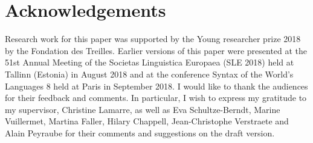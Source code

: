 \documentclass[output=paper,colorlinks,citecolor=brown, language=chinese]{langscibook}
\begin{document}
\section*{Acknowledgements}
Research work for this paper was supported by the Young researcher prize 2018 by the Fondation des Treilles. Earlier versions of this paper were presented at the 51st Annual Meeting of the Societas Linguistica Europaea (SLE 2018) held at Tallinn (Estonia) in August 2018 and at the conference Syntax of the World's Languages 8 held at Paris in September 2018. I would like to thank the audiences for their feedback and comments. In particular, I wish to express my gratitude to my supervisor, Christine Lamarre, as well as Eva Schultze-Berndt, Marine Vuillermet, Martina Faller, Hilary Chappell, Jean-Christophe Verstraete and Alain Peyraube for their comments and suggestions on the draft version.

\printbibliography[heading=subbibliography,notkeyword=this]
\end{document}
